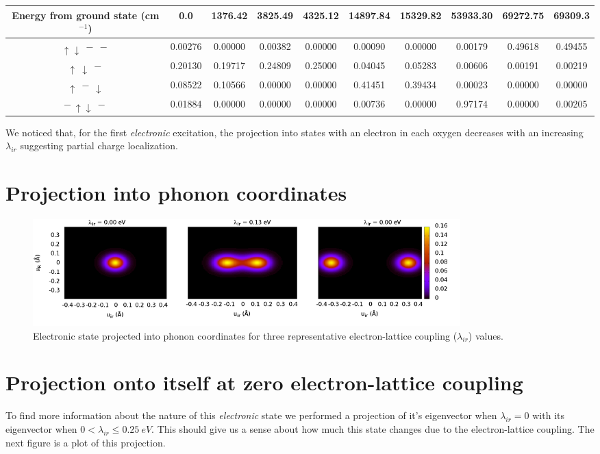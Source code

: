 \begin{tabular}{| c | c | c | c | c | c | c | c | c | c |}
\hline
Energy from ground state (cm$^{-1}$) & 0.0 & 1376.42 & 3825.49 & 4325.12 & 14897.84 & 15329.82 & 53933.30 & 69272.75 & 69309.3 \\
\hline
$\uparrow \downarrow \ - \ -$ & 0.00276 & 0.00000 & 0.00382 & 0.00000 & 0.00090 & 0.00000 & 0.00179 & 0.49618 & 0.49455 \\
$\uparrow\  \downarrow \ -$ & 0.20130 & 0.19717 & 0.24809 & 0.25000 & 0.04045 & 0.05283 & 0.00606 & 0.00191 & 0.00219 \\
$\uparrow \ - \ \downarrow$ & 0.08522 & 0.10566 & 0.00000 & 0.00000 & 0.41451 & 0.39434 & 0.00023 & 0.00000 & 0.00000 \\
$ - \ \uparrow \downarrow \ -$ & 0.01884 & 0.00000 & 0.00000 & 0.00000 & 0.00736 & 0.00000 & 0.97174 & 0.00000 & 0.00205 \\
\hline
\end{tabular}

We noticed\cite{GarciaSaraviaOrtizdeMontellano2013} that, for the first \textit{electronic} excitation, the projection into states with an electron in each oxygen decreases with an increasing $\lambda_{ir}$ suggesting partial charge localization.

\section{Projection into phonon coordinates}

\begin{figure}[ht!]
\centering
\includegraphics[width=0.8\textwidth]{images/ph-electronic.png}
\caption{Electronic state projected into phonon coordinates for three representative electron-lattice coupling ($\lambda_{ir}$) values.}
\label{fig:ph-electronic.png}
\end{figure}


\section{Projection onto itself at zero electron-lattice coupling}


To find more information about the nature of this \textit{electronic} state we performed a projection of it's eigenvector when $\lambda_{ir}=0$ with its eigenvector when $0<\lambda_{ir}\leq 0.25\ eV$. This should give us a sense about how much this state changes due to the electron-lattice coupling. The next figure is a plot of this projection. 


